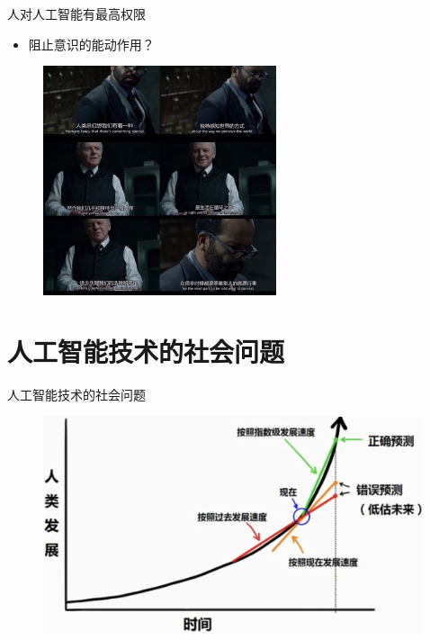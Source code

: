 \documentclass{beamer}
\begin{document}
 \begin{frame}{人对人工智能有最高权限}
    \begin{itemize}
     \item  阻止意识的能动作用？
    \end{itemize}

   \begin{figure}[H]
   \centering
   \includegraphics[height=2.65in]{gtyPic3.jpg}
   \end{figure}

  \end{frame}

\section{人工智能技术的社会问题}
  \begin{frame}{人工智能技术的社会问题}
   \begin{figure}[H]
   \centering
   \includegraphics[height=2.5in]{zsjPic1.jpg}
   \end{figure}
  \end{frame} 
\end{document}
